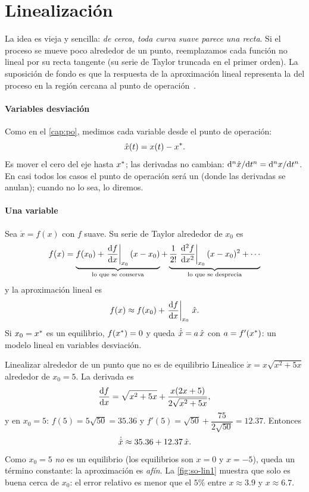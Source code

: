 \section{Linealización}
\label{sec:so-linealizacion}

La idea es vieja y sencilla: \emph{de cerca, toda curva suave parece una recta}. Si el proceso se mueve poco alrededor de un punto, reemplazamos cada función no lineal por su recta tangente (su serie de Taylor truncada en el primer orden). La suposición de fondo es que la respuesta de la aproximación lineal representa la del proceso en la región cercana al punto de operación~\citep{SmCo06,DoBi08}.

\paragraph{Variables desviación} Como en el \cref{cap:po}, medimos cada variable desde el punto de operación:
\begin{equation}
  \hat{x}(t)=x(t)-x^{*}.
  \label{eq:so-desviacion}
\end{equation}
Es mover el cero del eje hasta $x^{*}$; las derivadas no cambian: $\mathrm{d}^n\hat{x}/\mathrm{d} t^n=\mathrm{d}^n x/\mathrm{d} t^n$. En casi todos los casos el punto de operación será un  (donde las derivadas se anulan); cuando no lo sea, lo diremos.

\paragraph{Una variable} Sea $\dot x=f(x)$ con $f$ suave. Su serie de Taylor alrededor de $x_0$ es
\[
  f(x)=\underbrace{f(x_0)+\left.\frac{\mathrm{d} f}{\mathrm{d} x}\right|_{x_0}(x-x_0)}_{\text{lo que se conserva}}
  +\underbrace{\frac{1}{2!}\left.\frac{\mathrm{d}^2f}{\mathrm{d} x^2}\right|_{x_0}(x-x_0)^2+\cdots}_{\text{lo que se desprecia}}
\]
y la aproximación lineal es
\begin{equation}
  f(x)\approx f(x_0)+\left.\frac{\mathrm{d} f}{\mathrm{d} x}\right|_{x_0}\,\hat{x}.
  \label{eq:so-taylor1}
\end{equation}
Si $x_0=x^{*}$ es un equilibrio, $f(x^{*})=0$ y queda $\dot{\hat{x}}=a\,\hat{x}$ con $a=f'(x^{*})$: un modelo lineal en variables desviación.

\begin{ejemplo}[label=ej:so-lin1]{Linealizar alrededor de un punto que no es de equilibrio}
Linealice $\dot x=x\sqrt{x^2+5x}$ alrededor de $x_0=5$.
\solucion La derivada es
\[
  \frac{\mathrm{d} f}{\mathrm{d} x}=\sqrt{x^2+5x}+\frac{x(2x+5)}{2\sqrt{x^2+5x}},
\]
y en $x_0=5$: $f(5)=5\sqrt{50}=35.36$ y $f'(5)=\sqrt{50}+\dfrac{75}{2\sqrt{50}}=12.37$. Entonces
\[
  \dot{\hat{x}}\approx35.36+12.37\,\hat{x}.
\]
Como $x_0=5$ \emph{no} es un equilibrio (los equilibrios son $x=0$ y $x=-5$), queda un término constante: la aproximación es \emph{afín}. La \cref{fig:so-lin1} muestra que solo es buena cerca de $x_0$: el error relativo es menor que el $5\%$ entre $x\approx3.9$ y $x\approx6.7$.
\end{ejemplo}

